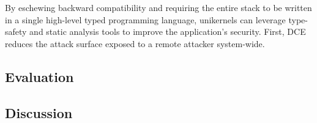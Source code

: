 By eschewing backward compatibility and requiring the entire stack to be written in a single high-level typed programming language, unikernels can leverage type-safety and static analysis tools to improve the application's security.
First, DCE reduces the attack surface exposed to a remote attacker system-wide.

\subsection{Evaluation}
\subsection{Discussion}
%
%
%
%
